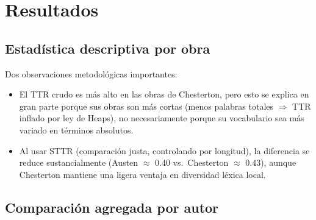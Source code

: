 \documentclass[11pt]{article}
\begin{document}
\section{Resultados}

\subsection{Estadística descriptiva por obra}

\begin{table}[H]
\centering
\caption{Métricas descriptivas por obra}
\end{table}

Dos observaciones metodológicas importantes:
\begin{itemize}
    \item El TTR crudo es más alto en las obras de Chesterton, pero esto se explica en gran parte porque sus obras son más cortas (menos palabras totales $\Rightarrow$ TTR inflado por ley de Heaps), no necesariamente porque su vocabulario sea más variado en términos absolutos.
    \item Al usar STTR (comparación justa, controlando por longitud), la diferencia se reduce sustancialmente (Austen $\approx$ 0.40 vs.\ Chesterton $\approx$ 0.43), aunque Chesterton mantiene una ligera ventaja en diversidad léxica local.
\end{itemize}

\subsection{Comparación agregada por autor}
\end{document}
